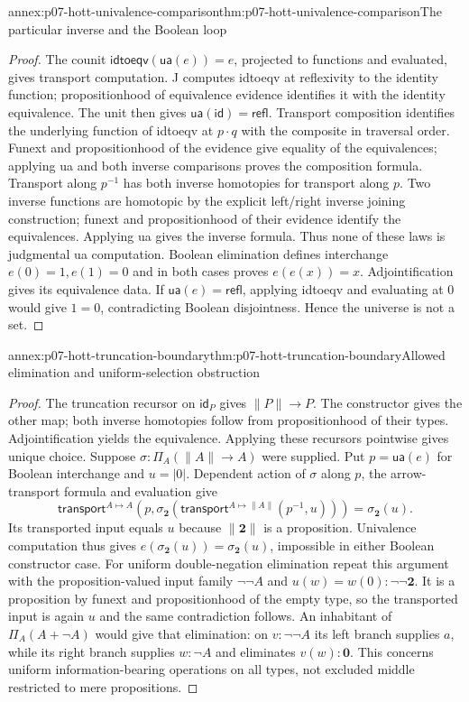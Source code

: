 \begin{annexitem}{annex:p07-hott-univalence-comparison}{thm:p07-hott-univalence-comparison}{The particular inverse and the Boolean loop}
\begin{proof}
The counit $\mathsf{idtoeqv}(\mathsf{ua}(e))=e$, projected to functions
and evaluated, gives transport computation. J computes idtoeqv at
reflexivity to the identity function; propositionhood of equivalence
evidence identifies it with the identity equivalence. The unit then
gives $\mathsf{ua}(\mathsf{id})=\mathsf{refl}$.
Transport composition identifies the underlying function of idtoeqv
at $p\cdot q$ with the composite in traversal order. Funext and
propositionhood of the evidence give equality of the equivalences;
applying ua and both inverse comparisons proves the composition formula.
Transport along $p^{-1}$ has both inverse homotopies for transport
along $p$. Two inverse functions are homotopic by the explicit
left/right inverse joining construction; funext and propositionhood
of their evidence identify the equivalences. Applying ua gives the
inverse formula. Thus none of these laws is judgmental ua computation.
Boolean elimination defines interchange $e(0)=1,e(1)=0$ and in both
cases proves $e(e(x))=x$. Adjointification gives its equivalence data.
If $\mathsf{ua}(e)=\mathsf{refl}$, applying idtoeqv and evaluating
at $0$ would give $1=0$, contradicting Boolean disjointness.
Hence the universe is not a set.
\end{proof}
\end{annexitem}

\begin{annexitem}{annex:p07-hott-truncation-boundary}{thm:p07-hott-truncation-boundary}{Allowed elimination and uniform-selection obstruction}
\begin{proof}
The truncation recursor on $\mathsf{id}_P$ gives $\|P\|\to P$.
The constructor gives the other map; both inverse homotopies follow
from propositionhood of their types. Adjointification yields the
equivalence. Applying these recursors pointwise gives unique choice.
Suppose $\sigma:\Pi_A(\|A\|\to A)$ were supplied. Put
$p=\mathsf{ua}(e)$ for Boolean interchange and $u=|0|$.
Dependent action of $\sigma$ along $p$, the arrow-transport formula
and evaluation give
\[
 \mathsf{transport}^{A\mapsto A}
 (p,\sigma_{\mathbf2}(\mathsf{transport}^{A\mapsto\|A\|}(p^{-1},u)))
 =\sigma_{\mathbf2}(u).
\]
Its transported input equals $u$ because $\|\mathbf2\|$ is a
proposition. Univalence computation thus gives
$e(\sigma_{\mathbf2}(u))=\sigma_{\mathbf2}(u)$, impossible in either
Boolean constructor case. For uniform double-negation elimination
repeat this argument with the proposition-valued input family
$\neg\neg A$ and $u(w)=w(0):\neg\neg\mathbf2$. It is a proposition
by funext and propositionhood of the empty type, so the transported
input is again $u$ and the same contradiction follows.
An inhabitant of $\Pi_A(A+\neg A)$ would give that elimination:
on $v:\neg\neg A$ its left branch supplies $a$, while its right
branch supplies $w:\neg A$ and eliminates $v(w):\mathbf0$.
This concerns uniform information-bearing operations on all types,
not excluded middle restricted to mere propositions.
\end{proof}
\end{annexitem}

